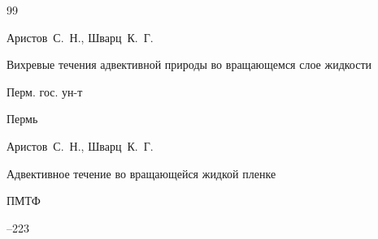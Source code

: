 \begin{thebibliography}{99}












\by Аристов~С.~Н., Шварц~К.~Г.

\book Вихревые течения адвективной природы во вращающемся слое жидкости


\publ Перм. гос. ун-т

\publaddr Пермь















\by Аристов~С.~Н., Шварц~К.~Г.

\paper Адвективное течение во вращающейся жидкой пленке

\jour ПМТФ




--223





\end{thebibliography}
